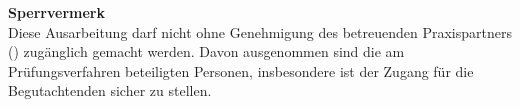 \begin{spacing}{1}{
    \noindent\color{HKS14-100}\textbf{\large
    Sperrvermerk}\vspace{.5em}\\\small Diese Ausarbeitung darf nicht ohne
    Genehmigung des betreuenden Praxispartners (\myCompany) zugänglich
    gemacht werden. Davon ausgenommen sind die am
    Prü\-f\-ungs\-ver\-fah\-ren beteiligten Personen, insbesondere ist der
    Zugang für die Be\-gut\-ach\-ten\-den sicher zu stellen.
}
\end{spacing}